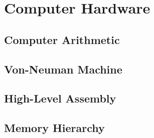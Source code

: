 \chapter{Computer Hardware}

\section{Computer Arithmetic}

\section{Von-Neuman Machine}

\section{High-Level Assembly}

\section{Memory Hierarchy}

